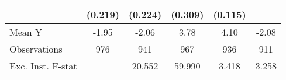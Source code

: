{\begin{tabular}{l*{5}{c}}
            &     (0.219)         &     (0.224)         &     (0.309)         &     (0.115)         &                     \\
\midrule
Mean Y      &       -1.95         &       -2.06         &        3.78         &        4.10         &       -2.08         \\
Observations&         976         &         941         &         967         &         936         &         911         \\
Exc. Inst. F-stat&                     &      20.552         &      59.990         &       3.418         &       3.258         \\
\bottomrule
\end{tabular}
}
